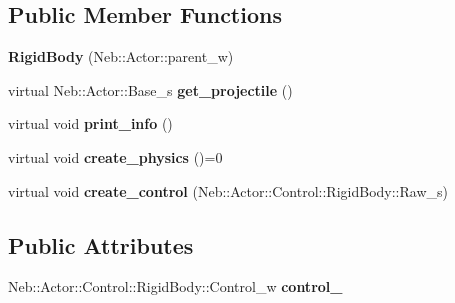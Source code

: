 \subsection*{\-Public \-Member \-Functions}
\begin{DoxyCompactItemize}
\item 
\hypertarget{classNeb_1_1Actor_1_1RigidBody_1_1RigidBody_a5a7032a278c85b233434d07053e259df}{{\bfseries \-Rigid\-Body} (\-Neb\-::\-Actor\-::parent\-\_\-w)}\label{classNeb_1_1Actor_1_1RigidBody_1_1RigidBody_a5a7032a278c85b233434d07053e259df}

\item 
\hypertarget{classNeb_1_1Actor_1_1RigidBody_1_1RigidBody_af2815897f5fbbfcf14617d95eed86275}{virtual \-Neb\-::\-Actor\-::\-Base\-\_\-s {\bfseries get\-\_\-projectile} ()}\label{classNeb_1_1Actor_1_1RigidBody_1_1RigidBody_af2815897f5fbbfcf14617d95eed86275}

\item 
\hypertarget{classNeb_1_1Actor_1_1RigidBody_1_1RigidBody_a5c25ce0493726ce917186750ebeb31a8}{virtual void {\bfseries print\-\_\-info} ()}\label{classNeb_1_1Actor_1_1RigidBody_1_1RigidBody_a5c25ce0493726ce917186750ebeb31a8}

\item 
\hypertarget{classNeb_1_1Actor_1_1RigidBody_1_1RigidBody_af2539a291e5206516c0b0e4b8717a809}{virtual void {\bfseries create\-\_\-physics} ()=0}\label{classNeb_1_1Actor_1_1RigidBody_1_1RigidBody_af2539a291e5206516c0b0e4b8717a809}

\item 
\hypertarget{classNeb_1_1Actor_1_1RigidBody_1_1RigidBody_a3b214f40b91461dc3d1082219c5e23fe}{virtual void {\bfseries create\-\_\-control} (\-Neb\-::\-Actor\-::\-Control\-::\-Rigid\-Body\-::\-Raw\-\_\-s)}\label{classNeb_1_1Actor_1_1RigidBody_1_1RigidBody_a3b214f40b91461dc3d1082219c5e23fe}

\end{DoxyCompactItemize}
\subsection*{\-Public \-Attributes}
\begin{DoxyCompactItemize}
\item 
\hypertarget{classNeb_1_1Actor_1_1RigidBody_1_1RigidBody_ad63689c6669d7dbb11f1121ea411faea}{\-Neb\-::\-Actor\-::\-Control\-::\-Rigid\-Body\-::\-Control\-\_\-w {\bfseries control\-\_\-}}\label{classNeb_1_1Actor_1_1RigidBody_1_1RigidBody_ad63689c6669d7dbb11f1121ea411faea}

\end{DoxyCompactItemize}
